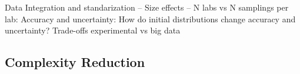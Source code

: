 \documentclass[english,12pt]{article}
\begin{document}
Data Integration and standarization -- Size effects -- N labs vs N
samplings per lab: Accuracy and uncertainty: How do initial
distributions change accuracy and uncertainty? Trade-offs experimental
vs big data

\subsection{Complexity Reduction}

\end{document}
